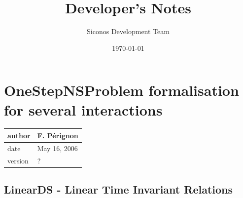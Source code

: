 \documentclass[10pt]{report}
\begin{document}
\thispagestyle{empty}
\title{Developer's Notes}
\author{Siconos Development Team}

\date{\today}
\maketitle

\tableofcontents
\clearpage
\pagestyle{fancy}

\chapter{OneStepNSProblem formalisation for several interactions}

\begin{table}[!ht]
  \begin{tabular}{|l|l|}
    \hline
    author  & F. P\'erignon \\
    \hline
    date    & May 16, 2006 \\ 
    \hline
    version & ? \\
    \hline
  \end{tabular}
\end{table}



\section{LinearDS - Linear Time Invariant Relations}
\end{document}
